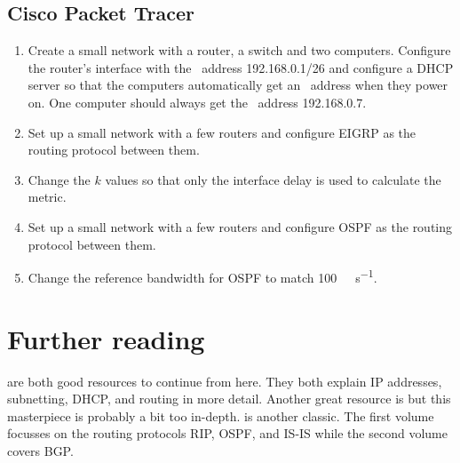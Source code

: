 \subsection{Cisco Packet Tracer}
\begin{enumerate}[resume]
\item
   Create a small network with a router, a switch and two computers.
   Configure the router's interface with the \IP\ address 192.168.0.1/26 and configure a \acs{DHCP} server so that the computers automatically get an \IP\ address when they power on.
   One computer should always get the \IP\ address 192.168.0.7.
\item
   Set up a small network with a few routers and configure \acs{EIGRP} as the routing protocol between them.
\item
   Change the $k$ values so that only the interface delay is used to calculate the metric.
\item
   Set up a small network with a few routers and configure \acs{OSPF} as the routing protocol between them.
\item
   Change the reference bandwidth for \acs{OSPF} to match \SI{100}{\giga\bit\per\second}.
\end{enumerate}



\section{Further reading}
\label{sec:ip-reading}
\textcite{lammle-ccna,lammle-comptia} are both good resources to continue from here.
They both explain \acs{IP} addresses, subnetting, \acs{DHCP}, and routing in more detail.
Another great resource is \textcite{stevens} but this masterpiece is probably a bit too in-depth.
\textcite{doyle} is another classic.
The first volume focusses on the routing protocols \acs{RIP}, \acs{OSPF}, and \acs{IS-IS} while the second volume covers \acs{BGP}.
